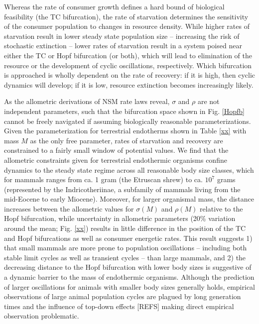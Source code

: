 \documentclass[12pt,english]{article}
\begin{document}
\begin{spacing}{1.9}
Whereas the rate of consumer growth defines a hard bound of biological feasibility (the TC bifurcation), the rate of starvation determines the sensitivity of the consumer population to changes in resource density.
While higher rates of starvation result in lower steady state population size -- increasing the risk of stochastic extinction -- lower rates of starvation result in a system poised near either the TC or Hopf bifurcation (or both), which will lead to elimination of the resource or the development of cyclic oscillations, respectively.
Which bifurcation is approached is wholly dependent on the rate of recovery: if it is high, then cyclic dynamics will develop; if it is low, resource extinction becomes increasingly likely.




As the allometric derivations of NSM rate laws reveal, $\sigma$ and $\rho$ are not independent parameters, such that the bifurcation space shown in Fig. \ref{Hopfb} cannot be freely navigated if assuming biologically reasonable parameterizations.
Given the parameterization for terrestrial endotherms shown in Table \ref{xx} with mass $M$ as the only free parameter, rates of starvation and recovery are constrained to a fairly small window of potential values.
We find that the allometric constraints given for terrestrial endothermic organisms confine dynamics to the steady state regime across all reasonable body size classes, which for mammals ranges from ca. 1 gram (the Etruscan shrew) to ca. $10^7$ grams (represented by the Indricotheriinae, a subfamily of mammals living from the mid-Eocene to early Miocene).
Moreover, for larger organismal mass, the distance increases between the allometric values for $\sigma(M)$ and $\rho(M)$ relative to the Hopf bifurcation, while uncertainty in allometric parameters (20\% variation around the mean; Fig. \ref{xx}) results in little difference in the position of the TC and Hopf bifurcations as well as consumer energetic rates.
This result suggests 
1) that small mammals are more prone to population oscillations -- including both stable limit cycles as well as transient cycles -- than large mammals, and
2) the decreasing distance to the Hopf bifurcation with lower body sizes is suggestive of a dynamic barrier to the mass of endothermic organisms.
Although the prediction of larger oscillations for animals with smaller body sizes generally holds, empirical observations of large animal population cycles are plagued by long generation times and the influence of top-down effects [REFS] making direct empirical observation problematic.





\end{spacing}
\end{document}
